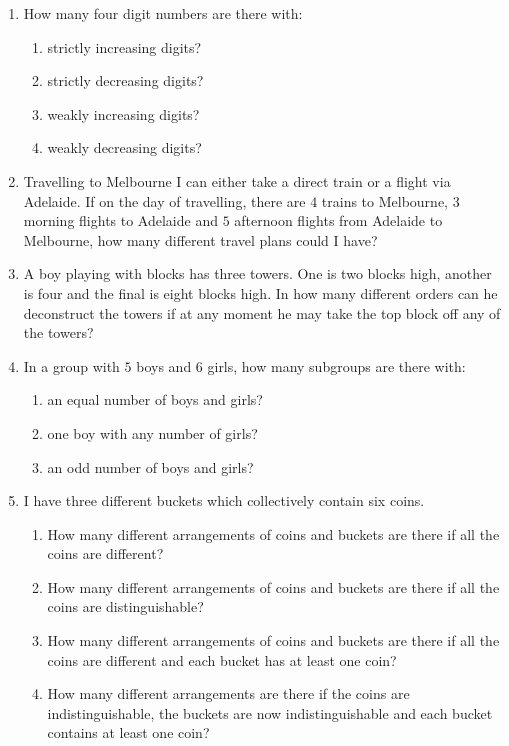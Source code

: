 \documentclass[12pt]{article}
\begin{document}
\begin{enumerate}
	\item How many four digit numbers are there with:
	\begin{enumerate}
		\item strictly increasing digits?
		\item strictly decreasing digits?
		\item weakly increasing digits?
		\item weakly decreasing digits?
	\end{enumerate}
	\item Travelling to Melbourne I can either take a direct train or a flight via Adelaide. If on the day of travelling, there are $4$ trains to Melbourne, $3$ morning flights to Adelaide and $5$ afternoon flights from Adelaide to Melbourne, how many different travel plans could I have?
	\item A boy playing with blocks has three towers. One is two blocks high, another is four and the final is eight blocks high. In how many different orders can he deconstruct the towers if at any moment he may take the top block off any of the towers?
	\item In a group with $5$ boys and $6$ girls, how many subgroups are there with:
	\begin{enumerate}
		\item an equal number of boys and girls?
		\item one boy with any number of girls?
		\item an odd number of boys and girls?
	\end{enumerate}
	\item I have three different buckets which collectively contain six coins.
	\begin{enumerate}
		\item How many different arrangements of coins and buckets are there if all the coins are different?
		\item How many different arrangements of coins and buckets are there if all the coins are distinguishable?
		\item How many different arrangements of coins and buckets are there if all the coins are different and each bucket has at least one coin?
		\item How many different arrangements are there if the coins are indistinguishable, the buckets are now indistinguishable and each bucket contains at least one coin?
	\end{enumerate}

\end{enumerate}
\end{document}
